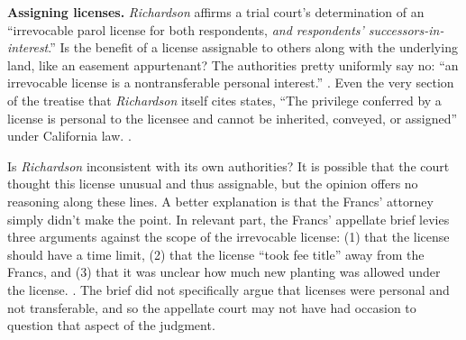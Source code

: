 

\item \textbf{Assigning licenses.} \emph{Richardson} affirms a trial court's
determination of an ``irrevocable parol license for both respondents, \emph{and
respondents' successors-in-interest}.'' Is the benefit of a license
assignable to others along with the underlying land, like an easement
appurtenant? The authorities pretty uniformly say no: ``an irrevocable license
is a nontransferable personal interest.'' . Even the very section of the
treatise that \emph{Richardson} itself cites states, ``The privilege conferred
by a license is personal to the licensee and cannot be inherited, conveyed, or
assigned'' under California law. .

Is \emph{Richardson} inconsistent with its own authorities? It is possible that
the court thought this license unusual and thus assignable, but the opinion
offers no reasoning along these lines. A better explanation is that the Francs'
attorney simply didn't make the point. In relevant part, the Francs'
appellate brief levies three arguments against the scope of the irrevocable
license: (1) that the license should have a time limit, (2) that the license
``took fee title'' away from the Francs, and (3) that it was unclear how much
new planting was allowed under the license. . The
brief did not specifically argue that licenses were personal and not
transferable, and so the appellate court may not have had occasion to question
that aspect of the judgment.
